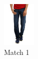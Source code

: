 \begin{figure}[H]
\begin{subfigure}[b]{0.19\textwidth}
        \includegraphics[width=\textwidth]{images/output2.jpeg}
        \caption{Match 1}
    \end{subfigure}
    \begin{subfigure}[b]{0.19\textwidth}

\end{subfigure}
\end{figure}
